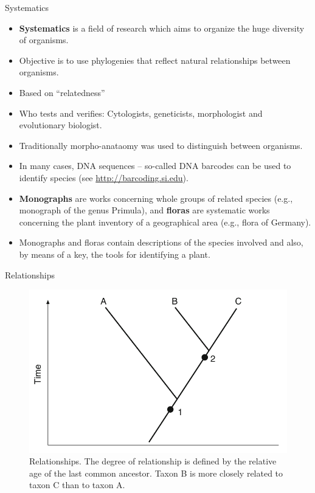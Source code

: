 \documentclass[ignorenonframetext,aspectratio=169]{beamer}
\providecommand{\tightlist}{%
  \setlength{\itemsep}{0pt}\setlength{\parskip}{0pt}}
\begin{document}
\begin{frame}{Systematics}
\protect\hypertarget{systematics}{}

\begin{itemize}
\tightlist
\item
  \textbf{Systematics} is a field of research which aims to organize the
  huge diversity of organisms.
\item
  Objective is to use phylogenies that reflect natural relationships
  between organisms.
\item
  Based on ``relatedness''
\item
  Who tests and verifies: Cytologists, geneticists, morphologist and
  evolutionary biologist.
\item
  Traditionally morpho-anataomy was used to distinguish between
  organisms.
\item
  In many cases, DNA sequences -- so-called DNA barcodes can be used to
  identify species (see \url{http://barcoding.si.edu}).
\item
  \textbf{Monographs} are works concerning whole groups of related
  species (e.g., monograph of the genus Primula), and \textbf{floras}
  are systematic works concerning the plant inventory of a geographical
  area (e.g., flora of Germany).
\item
  Monographs and floras contain descriptions of the species involved and
  also, by means of a key, the tools for identifying a plant.
\end{itemize}

\end{frame}

\begin{frame}{Relationships}
\protect\hypertarget{relationships}{}

\begin{figure}
\includegraphics[width=0.5\linewidth]{./../images/relationship_common_ancestor} \caption{Relationships. The degree of relationship is defined by the relative age of the last common ancestor. Taxon B is more closely related to taxon C than to taxon A.}\label{fig:taxon-relationships}
\end{figure}

\end{frame}
\end{document}
